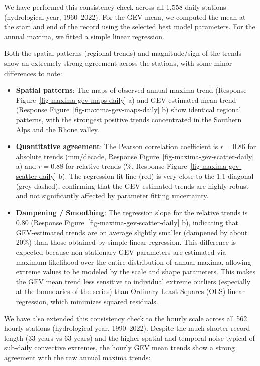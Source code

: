 \documentclass[
  letterpaper,
  DIV=11,
  numbers=noendperiod]{scrartcl}
\providecommand{\tightlist}{%
  \setlength{\itemsep}{0pt}\setlength{\parskip}{0pt}}\usepackage{longtable,booktabs,array}
\begin{document}
We have performed this consistency check across all 1,558 daily stations
(hydrological year, 1960--2022). For the GEV mean, we computed the mean
at the start and end of the record using the selected best model
parameters. For the annual maxima, we fitted a simple linear regression.

Both the spatial patterns (regional trends) and magnitude/sign of the
trends show an extremely strong agreement across the stations, with some
minor differences to note:

\begin{itemize}
\tightlist
\item
  \textbf{Spatial patterns}: The maps of observed annual maxima trend
  (Response Figure~\ref{fig-maxima-gev-maps-daily} a) and GEV-estimated
  mean trend (Response Figure~\ref{fig-maxima-gev-maps-daily} b) show
  identical regional patterns, with the strongest positive trends
  concentrated in the Southern Alps and the Rhone valley.
\item
  \textbf{Quantitative agreement}: The Pearson correlation coefficient
  is \textbf{\(r = 0.86\)} for absolute trends (mm/decade, Response
  Figure~\ref{fig-maxima-gev-scatter-daily} a) and \textbf{\(r = 0.88\)}
  for relative trends (\%, Response
  Figure~\ref{fig-maxima-gev-scatter-daily} b). The regression fit line
  (red) is very close to the 1:1 diagonal (grey dashed), confirming that
  the GEV-estimated trends are highly robust and not significantly
  affected by parameter fitting uncertainty.
\item
  \textbf{Dampening / Smoothing}: The regression slope for the relative
  trends is \textbf{\(0.80\)} (Response
  Figure~\ref{fig-maxima-gev-scatter-daily} b), indicating that
  GEV-estimated trends are on average slightly smaller (dampened by
  about 20\%) than those obtained by simple linear regression. This
  difference is expected because non-stationary GEV parameters are
  estimated via maximum likelihood over the entire distribution of
  annual maxima, allowing extreme values to be modeled by the scale and
  shape parameters. This makes the GEV mean trend less sensitive to
  individual extreme outliers (especially at the boundaries of the
  series) than Ordinary Least Squares (OLS) linear regression, which
  minimizes squared residuals.
\end{itemize}

We have also extended this consistency check to the hourly scale across
all 562 hourly stations (hydrological year, 1990--2022). Despite the
much shorter record length (33 years vs 63 years) and the higher spatial
and temporal noise typical of sub-daily convective extremes, the hourly
GEV mean trends show a strong agreement with the raw annual maxima
trends:
\end{document}
